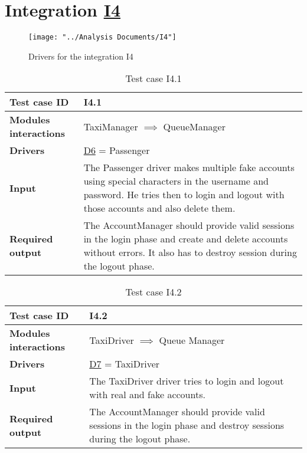 \section{Integration \hyperref[I4]{I4} \label{int_I4}}

\begin{figure}[H]
\centering
\texttt{[image: "../Analysis Documents/I4"]}
\caption{Drivers for the integration I4}
\end{figure}

\begin{table}[H]
	\begin{tabular}{ l | p{} }
		\textbf{Test case ID} & I4.1 \\ \hline
		\textbf{Modules interactions} & TaxiManager $\implies$ QueueManager \\ \hline
		\textbf{Drivers} &  \hyperref[D6]{D6} = Passenger \\ \hline
		\textbf{Input} &  The Passenger driver makes multiple fake accounts using special characters in the username and password. He tries then to login and logout with those accounts and also delete them. \\ \hline
		\textbf{Required output} & The AccountManager should provide valid sessions in the login phase and create and delete accounts without errors. It also has to destroy session during the logout phase.
	\end{tabular}
	\caption{Test case I4.1}
\end{table}

\begin{table}[H]
	\begin{tabular}{ l | p{} }
		\textbf{Test case ID} & I4.2 \\ \hline
		\textbf{Modules interactions} & TaxiDriver $\implies$ Queue Manager \\ \hline
		\textbf{Drivers} &  \hyperref[D7]{D7} = TaxiDriver \\ \hline
		\textbf{Input} &  The TaxiDriver driver tries to login and logout with real and fake accounts. \\ \hline
		\textbf{Required output} & The AccountManager should provide valid sessions in the login phase and destroy sessions during the logout phase.
	\end{tabular}
	\caption{Test case I4.2}
\end{table}